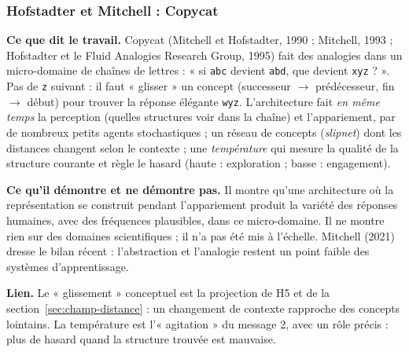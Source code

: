 \documentclass[a4paper,11pt]{article}
\newcommand{\cours}[1]{\par\smallskip\textbf{\textsf{#1}}\enspace}
\begin{document}
\subsubsection{Hofstadter et Mitchell : Copycat}
\cours{Ce que dit le travail.} Copycat (Mitchell et Hofstadter, 1990 ; Mitchell, 1993 ; Hofstadter et le Fluid Analogies Research Group, 1995) fait des analogies dans un micro-domaine de chaînes de lettres : « si \texttt{abc} devient \texttt{abd}, que devient \texttt{xyz} ? ». Pas de \texttt{z} suivant : il faut « glisser » un concept (successeur $\to$ prédécesseur, fin $\to$ début) pour trouver la réponse élégante \texttt{wyz}. L'architecture fait \emph{en même temps} la perception (quelles structures voir dans la chaîne) et l'appariement, par de nombreux petits agents stochastiques ; un réseau de concepts (\emph{slipnet}) dont les distances changent selon le contexte ; une \emph{température} qui mesure la qualité de la structure courante et règle le hasard (haute : exploration ; basse : engagement).
\cours{Ce qu'il démontre et ne démontre pas.} Il montre qu'une architecture où la représentation se construit pendant l'appariement produit la variété des réponses humaines, avec des fréquences plausibles, dans ce micro-domaine. Il ne montre rien sur des domaines scientifiques ; il n'a pas été mis à l'échelle. Mitchell (2021) dresse le bilan récent : l'abstraction et l'analogie restent un point faible des systèmes d'apprentissage.
\cours{Lien.} Le « glissement » conceptuel est la projection de H5 et de la section~\ref{sec:champ-distance} : un changement de contexte rapproche des concepts lointains. La température est l'« agitation » du message 2, avec un rôle précis : plus de hasard quand la structure trouvée est mauvaise.
\end{document}

